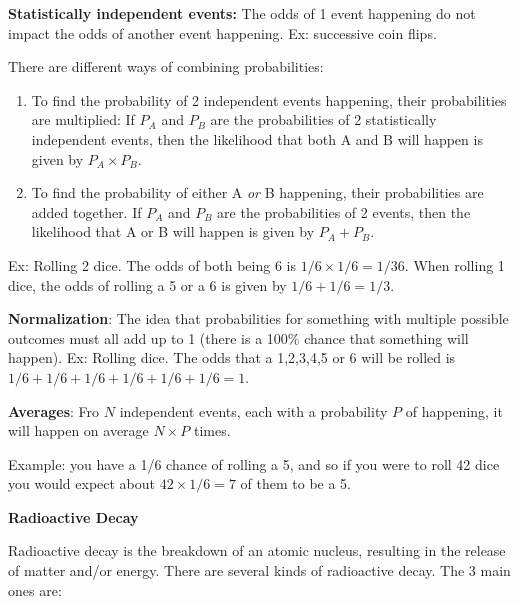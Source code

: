 \documentclass[12pt]{article}
\begin{document}
\textbf{Statistically independent events:} The odds of 1 event happening do not impact the odds of another event happening. Ex: successive coin flips.

There are different ways of combining probabilities:

\begin{enumerate}
	\item To find the probability of 2 independent events happening, their probabilities are multiplied: If $P_A$ and $P_B$ are the probabilities of 2 statistically independent events, then the likelihood that both A and B will happen is given by $P_A \times P_B$.
	\item To find the probability of either A \textit{or} B happening, their probabilities are added together. If $P_A$ and $P_B$ are the probabilities of 2 events, then the likelihood that A or B will happen is given by $P_A + P_B$.
\end{enumerate}

Ex: Rolling 2 dice. The odds of both being 6 is $1/6\times 1/6 = 1/36$. When rolling 1 dice, the odds of rolling a 5 or a 6 is given by $1/6 + 1/6  = 1/3$.

\textbf{Normalization}: The idea that probabilities for something with multiple possible outcomes must all add up to 1 (there is a 100\% chance that something will happen).
Ex: Rolling dice. The odds that a 1,2,3,4,5 or 6 will be rolled is $1/6+1/6+1/6+1/6+1/6+1/6 = 1$.

\textbf{Averages}: Fro $N$ independent events, each with a probability $P$ of happening, it will happen on average $N\times P$ times.

Example: you have a 1/6 chance of rolling a 5, and so if you were to roll 42 dice you would expect about $42\times 1/6 = 7$ of them to be a 5.

\clearpage

\noindent\textbf{\large Radioactive Decay}

Radioactive decay is the breakdown of an atomic nucleus, resulting in the release of matter and/or energy. There are several kinds of radioactive decay. The 3 main ones are:
\end{document}
